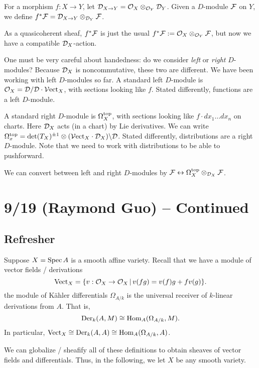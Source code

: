 \documentclass{article}
\begin{document}
\begin{dfn}
	For a morphism $f: X \to Y$, let $\mathcal{D}_{X \to Y} = \mathcal{O}_X \otimes_{\mathcal{O}_Y} \mathcal{D}_Y$.
	Given a $D$-module $\mathcal{F}$ on $Y$, we define $f^* \mathcal{F} = \mathcal{D}_{X \to Y} \otimes_{\mathcal{D}_Y} \mathcal{F}$.
\end{dfn}

As a quasicoherent sheaf, $f^* \mathcal{F}$ is just the usual $f^* \mathcal{F} := \mathcal{O}_X \otimes_{\mathcal{O}_Y} \mathcal{F}$, but now we have a compatible $\mathcal{D}_X$-action.

\begin{rmk}
	One must be very careful about handedness: do we consider \emph{left} or \emph{right} $D$-modules?
	Because $\mathcal{D}_X$ is noncommutative, these two are different.
	We have been working with left $D$-modules so far.
	A standard left $D$-module is $\mathcal{O}_X = \mathcal{D} / \mathcal{D} \cdot \mathcal{V}\mathrm{ect}_X$, with sections looking like $f$.
	Stated differently, functions are a left $D$-module.

	A standard right $D$-module is $\Omega_X^{\mathrm{top}}$, with sections looking like $f \cdot dx_1 \dots dx_n$ on charts.
	Here $\mathcal{D}_X$ acts (in a chart) by Lie derivatives.
	We can write $\Omega_x^{\mathrm{top}} = \det(T_X)^{\pm 1} \otimes (\mathcal{V}\mathrm{ect}_X \cdot \mathcal{D}_X) \backslash \mathcal{D}$.
	Stated differently, distributions are a right $D$-module.
	Note that we need to work with distributions to be able to pushforward.

	We can convert between left and right $D$-modules by $\mathcal{F} \leftrightarrow \Omega_X^{\mathrm{top}} \otimes_{\mathcal{D}_X} \mathcal{F}$.
\end{rmk}

\section{9/19 (Raymond Guo) -- Continued}

\subsection{Refresher}

Suppose $X = \operatorname{Spec} A$ is a smooth affine variety.
Recall that we have a module of vector fields / derivations
\[
	\mathrm{Vect}_X = \{ v: \mathcal{O}_X \to \mathcal{O}_X \,|\, v(fg) = v(f)g + f v(g) \}.
\]
the module of K\"ahler differentials $\Omega_{A/k}$ is the universal receiver of $k$-linear derivations from $A$.
That is,
\[
	\operatorname{Der}_k(A, M) \cong \operatorname{Hom}_A(\Omega_{A/k}, M).
\]
In particular, $\mathrm{Vect}_X \cong \operatorname{Der}_k(A, A) \cong \operatorname{Hom}_A(\Omega_{A/k}, A)$.

We can globalize / sheafify all of these definitions to obtain sheaves of vector fields and differentials.
Thus, in the following, we let $X$ be any smooth variety.
\end{document}
